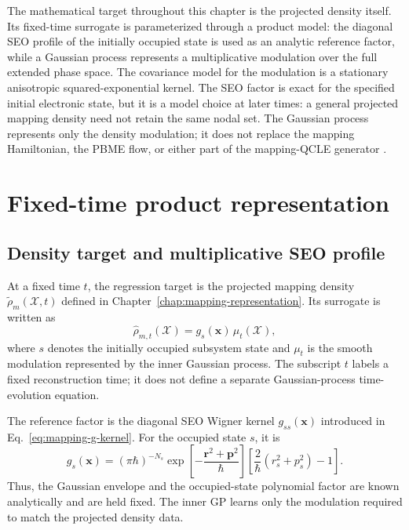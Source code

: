 \documentclass[
  11pt,
  letterpaper,
  onehalfspacing,
  normalmargins,
  equalmargins,
  oneside
]{ut-thesis}
\begin{document}
The mathematical target throughout this chapter is the projected density
itself. Its fixed-time surrogate is parameterized through a product model: the
diagonal SEO profile of the initially occupied state is used as an analytic
reference factor, while a Gaussian process represents a multiplicative
modulation over the full extended phase space. The covariance model for the
modulation is a stationary anisotropic squared-exponential kernel. The SEO
factor is exact for the specified initial electronic state, but it is a model
choice at later times: a general projected mapping density need not retain the
same nodal set. The Gaussian process represents only the density modulation;
it does not replace the mapping Hamiltonian, the PBME flow, or either part of
the mapping-QCLE generator
\cite{RasmussenWilliams2006,Bishop2006PRML,Kanagawa2018KernelGPReview,
Teckentrup2020,HennigOsborneGirolami2015}.


\section{Fixed-time product representation}
\label{sec:fixed-time-density-reconstruction}

\subsection{Density target and multiplicative SEO profile}
\label{subsec:density-target-role-gp}

At a fixed time \(t\), the regression target is the projected mapping density
\(\tilde\rho_m(\boldsymbol{\mathcal X},t)\) defined in
Chapter~\ref{chap:mapping-representation}. Its surrogate is written as
\begin{equation}
\widehat{\rho}_{m,t}(\boldsymbol{\mathcal X})
=
 g_s(\mathbf x)\,
 \mu_t(\boldsymbol{\mathcal X}),
\label{eq:gp-product-density}
\end{equation}
where \(s\) denotes the initially occupied subsystem state and
\(\mu_t\) is the smooth modulation represented by the inner Gaussian process.
The subscript \(t\) labels a fixed reconstruction time; it does not define a
separate Gaussian-process time-evolution equation.

The reference factor is the diagonal SEO Wigner kernel
\(g_{ss}(\mathbf x)\) introduced in
Eq.~\eqref{eq:mapping-g-kernel}. For the occupied state \(s\), it is
\begin{equation}
 g_s(\mathbf x)
=
(\pi\hbar)^{-N_s}
\exp\left[-\frac{\mathbf r^2+\mathbf p^2}{\hbar}\right]
\left[
\frac{2}{\hbar}
\left(r_s^2+p_s^2\right)-1
\right].
\label{eq:occupied-seo-reference-profile}
\end{equation}
Thus, the Gaussian envelope and the occupied-state polynomial factor are known
analytically and are held fixed. The inner GP learns only the modulation
required to match the projected density data.
\end{document}
